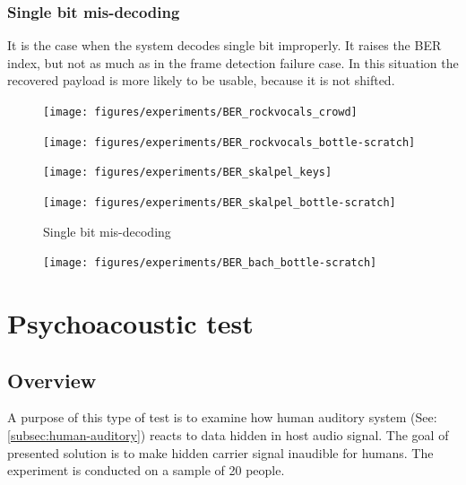 \subsubsection{Single bit mis-decoding}
It is the case when the system decodes single bit improperly. It raises the BER index, but not as much as in the frame detection failure case.
In this situation the recovered payload is more likely to be usable, because it is not shifted.
\begin{figure}[!hb]
\begin{minipage}[b]{0.45\textwidth}
  \texttt{[image: figures/experiments/BER\_rockvocals\_crowd]}
\end{minipage}\hfill
\begin{minipage}[b]{0.45\textwidth}
  \texttt{[image: figures/experiments/BER\_rockvocals\_bottle-scratch]}
\end{minipage}
\end{figure}
\begin{figure}[!hb]
\begin{minipage}[b]{0.45\textwidth}
  \texttt{[image: figures/experiments/BER\_skalpel\_keys]}
\end{minipage}\hfill
\begin{minipage}[b]{0.45\textwidth}
  \texttt{[image: figures/experiments/BER\_skalpel\_bottle-scratch]}
\end{minipage}
\label{fig:mis-decoding}
\caption{Single bit mis-decoding}
\end{figure}
\begin{figure}[!hb]
\begin{minipage}[b]{0.45\textwidth}
  \texttt{[image: figures/experiments/BER\_bach\_bottle-scratch]}
\end{minipage}\hfill
\end{figure}

\clearpage

\section{Psychoacoustic test}
\label{sec:psychoacoustic-test}

\subsection{Overview}
A purpose of this type of test is to examine how human auditory system (See: \ref{subsec:human-auditory}) reacts to data hidden
in host audio signal. The goal of presented solution is to make hidden carrier signal inaudible for humans. The experiment is conducted
on a sample of 20 people.

